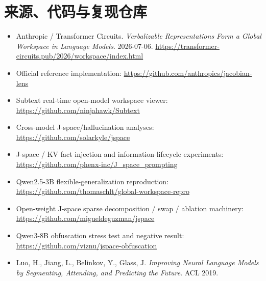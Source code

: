 \documentclass[10.5pt,a4paper]{ctexart}
\begin{document}
\section{来源、代码与复现仓库}
\begin{itemize}
  \item Anthropic / Transformer Circuits. \emph{Verbalizable Representations Form a Global Workspace in Language Models}. 2026-07-06. \url{https://transformer-circuits.pub/2026/workspace/index.html}
  \item Official reference implementation: \url{https://github.com/anthropics/jacobian-lens}
  \item Subtext real-time open-model workspace viewer: \url{https://github.com/ninjahawk/Subtext}
  \item Cross-model J-space/hallucination analyses: \url{https://github.com/solarkyle/jspace}
  \item J-space / KV fact injection and information-lifecycle experiments: \url{https://github.com/phenx-inc/J_space_prompting}
  \item Qwen2.5-3B flexible-generalization reproduction: \url{https://github.com/thomaschlt/global-workspace-repro}
  \item Open-weight J-space sparse decomposition / swap / ablation machinery: \url{https://github.com/migueldeguzman/jspace}
  \item Qwen3-8B obfuscation stress test and negative result: \url{https://github.com/viznu/jspace-obfuscation}
  \item Luo, H., Jiang, L., Belinkov, Y., Glass, J. \emph{Improving Neural Language Models by Segmenting, Attending, and Predicting the Future}. ACL 2019.
\end{itemize}
\end{document}
